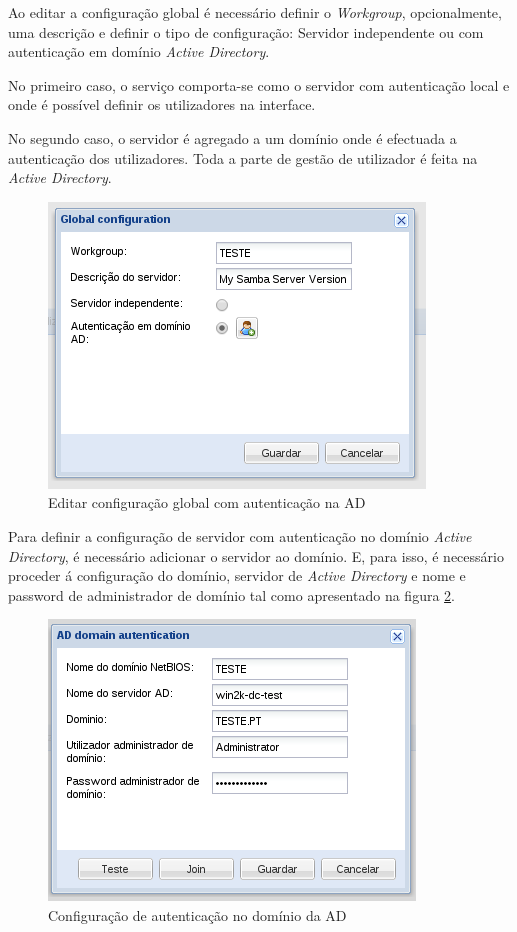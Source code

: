 Ao editar a configuração global é necessário definir o \emph{Workgroup}, opcionalmente, uma descrição e definir o tipo de configuração: Servidor independente ou com autenticação em domínio \emph{Active Directory}.

No primeiro caso, o serviço comporta-se como o servidor com autenticação local e onde é possível definir os utilizadores na interface.

No segundo caso, o servidor é agregado a um domínio onde é efectuada a autenticação dos utilizadores. Toda a parte de gestão de utilizador é feita na \emph{Active Directory}.

\begin{figure}[H]
    \begin{center}
    \includegraphics[scale=0.38]{screenshots/etfs/etfs_edit_global_config_ad.png}
    \caption{Editar configuração global com autenticação na AD}
    \label{fig:etfs_edit_global_config_ad}
    \end{center}
\end{figure}

Para definir a configuração de servidor com autenticação no domínio \emph{Active Directory}, é necessário adicionar o servidor ao domínio.
E, para isso, é necessário proceder á configuração do domínio, servidor de \emph{Active Directory} e nome e password de administrador de domínio tal como apresentado na figura \ref{fig:etfs_join_to_ad}.

\begin{figure}[H]
    \begin{center}
    \includegraphics[scale=0.38]{screenshots/etfs/etfs_join_to_ad.png}
    \caption{Configuração de autenticação no domínio da AD}
    \label{fig:etfs_join_to_ad}
    \end{center}
\end{figure}

